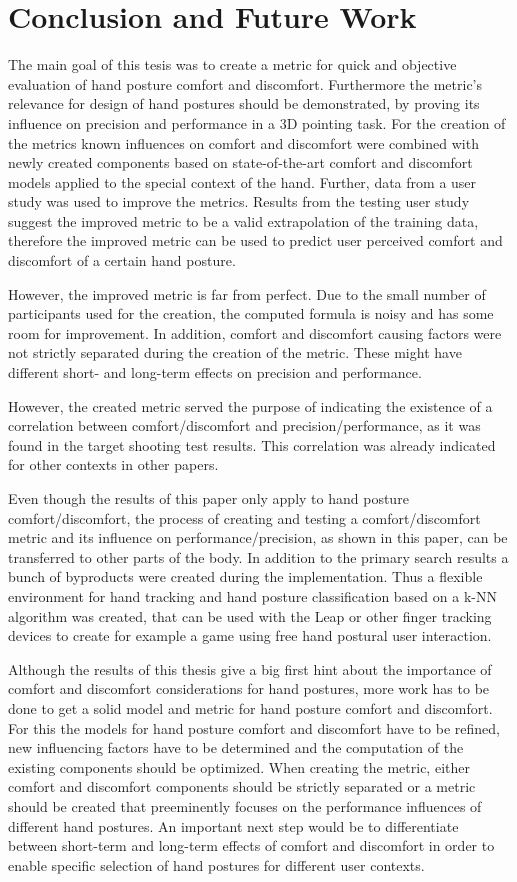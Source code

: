 \chapter{Conclusion and Future Work}\label{chapter:conclusion}

The main goal of this tesis was to create a metric for quick and objective evaluation of hand posture comfort and discomfort. Furthermore the metric's relevance for design of hand postures should be demonstrated, by proving its influence on precision and performance in a 3D pointing task. 
For the creation of the metrics known influences on comfort and discomfort were combined with newly created components based on state-of-the-art comfort and discomfort models applied to the special context of the hand. Further, data from a user study was used to improve the metrics. Results from the testing user study suggest the improved metric to be a valid extrapolation of the training data, therefore the improved metric can be used to predict user perceived comfort and discomfort of a certain hand posture.

However, the improved metric is far from perfect. Due to the small number of participants used for the creation, the computed formula is noisy and has some room for improvement. In addition, comfort and discomfort causing factors were not strictly separated during the creation of the metric. These might have different short- and long-term effects on precision and performance. 

However, the created metric served the purpose of indicating the existence of a correlation between comfort/discomfort and precision/performance, as it was found in the target shooting test results. This correlation was already indicated for other contexts in other papers.

Even though the results of this paper only apply to hand posture comfort/discomfort, the process of creating and testing a comfort/discomfort metric and its influence on performance/precision, as shown in this paper, can be transferred to other parts of the body. In addition to the primary search results a bunch of byproducts were created during the implementation. Thus a flexible environment for hand tracking and hand posture classification based on a k-NN algorithm was created, that can be used with the Leap or other finger tracking devices to create for example a game using free hand postural user interaction.

Although the results of this thesis give a big first hint about the importance of comfort and discomfort considerations for hand postures, more work has to be done to get a solid model and metric for hand posture comfort and discomfort. For this the models for hand posture comfort and discomfort have to be refined, new influencing factors have to be determined and the computation of the existing components should be optimized. When creating the metric, either comfort and discomfort components should be strictly separated or a metric should be created that preeminently focuses on the performance influences of different hand postures. An important next step would be to differentiate between short-term and long-term effects of comfort and discomfort in order to enable specific selection of hand postures for different user contexts. 